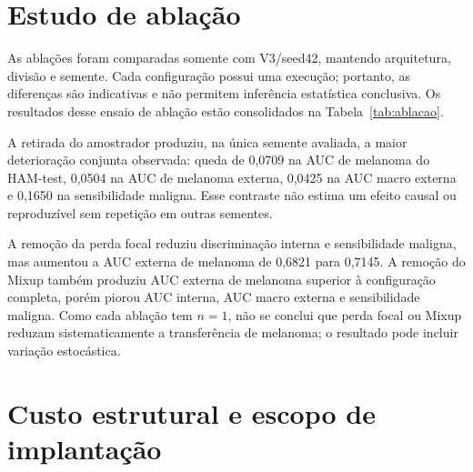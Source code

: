 \documentclass[oneside,english,brazilian]{UNISINOSmonografia}
\begin{document}
\section{Estudo de ablação}

As ablações foram comparadas somente com V3/seed42, mantendo arquitetura, divisão e semente. Cada configuração possui uma execução; portanto, as diferenças são indicativas e não permitem inferência estatística conclusiva. Os resultados desse ensaio de ablação estão consolidados na Tabela~\ref{tab:ablacao}.

\begin{table}[H]
\centering
\caption{Estudo de ablação da V3 com semente 42.}
\label{tab:ablacao}
\end{table}

A retirada do amostrador produziu, na única semente avaliada, a maior deterioração conjunta observada: queda de 0,0709 na AUC de melanoma do HAM-test, 0,0504 na AUC de melanoma externa, 0,0425 na AUC macro externa e 0,1650 na sensibilidade maligna. Esse contraste não estima um efeito causal ou reproduzível sem repetição em outras sementes.

A remoção da perda focal reduziu discriminação interna e sensibilidade maligna, mas aumentou a AUC externa de melanoma de 0,6821 para 0,7145. A remoção do Mixup também produziu AUC externa de melanoma superior à configuração completa, porém piorou AUC interna, AUC macro externa e sensibilidade maligna. Como cada ablação tem $n=1$, não se conclui que perda focal ou Mixup reduzam sistematicamente a transferência de melanoma; o resultado pode incluir variação estocástica.

\section{Custo estrutural e escopo de implantação}
\end{document}
